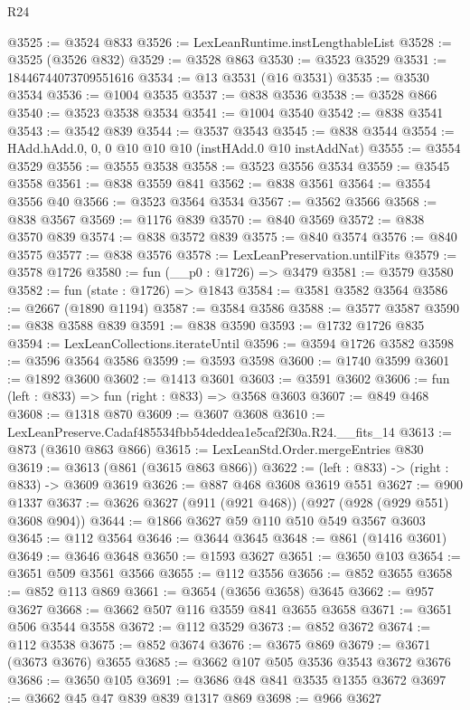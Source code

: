 \begin{lexlean}{R24}
\begin{coremodule}
@3525 := @3524 @833
@3526 := LexLeanRuntime.instLengthableList
@3528 := @3525 (@3526 @832)
@3529 := @3528 @863
@3530 := @3523 @3529
@3531 := 18446744073709551616
@3534 := @13 @3531 (@16 @3531)
@3535 := @3530 @3534
@3536 := @1004 @3535
@3537 := @838 @3536
@3538 := @3528 @866
@3540 := @3523 @3538 @3534
@3541 := @1004 @3540
@3542 := @838 @3541
@3543 := @3542 @839
@3544 := @3537 @3543
@3545 := @838 @3544
@3554 := HAdd.hAdd.{0, 0, 0} @10 @10 @10 (instHAdd.{0} @10 instAddNat)
@3555 := @3554 @3529
@3556 := @3555 @3538
@3558 := @3523 @3556 @3534
@3559 := @3545 @3558
@3561 := @838 @3559 @841
@3562 := @838 @3561
@3564 := @3554 @3556 @40
@3566 := @3523 @3564 @3534
@3567 := @3562 @3566
@3568 := @838 @3567
@3569 := @1176 @839
@3570 := @840 @3569
@3572 := @838 @3570 @839
@3574 := @838 @3572 @839
@3575 := @840 @3574
@3576 := @840 @3575
@3577 := @838 @3576
@3578 := LexLeanPreservation.untilFits
@3579 := @3578 @1726
@3580 := fun (__p0 : @1726) => @3479
@3581 := @3579 @3580
@3582 := fun (state : @1726) => @1843
@3584 := @3581 @3582 @3564
@3586 := @2667 (@1890 @1194)
@3587 := @3584 @3586
@3588 := @3577 @3587
@3590 := @838 @3588 @839
@3591 := @838 @3590
@3593 := @1732 @1726 @835
@3594 := LexLeanCollections.iterateUntil
@3596 := @3594 @1726 @3582
@3598 := @3596 @3564 @3586
@3599 := @3593 @3598
@3600 := @1740 @3599
@3601 := @1892 @3600
@3602 := @1413 @3601
@3603 := @3591 @3602
@3606 := fun (left : @833) => fun (right : @833) => @3568 @3603
@3607 := @849 @468
@3608 := @1318 @870
@3609 := @3607 @3608
@3610 := LexLeanPreserve.Cadaf485534fbb54deddea1e5caf2f30a.R24.__fits_14
@3613 := @873 (@3610 @863 @866)
@3615 := LexLeanStd.Order.mergeEntries @830
@3619 := @3613 (@861 (@3615 @863 @866))
@3622 := (left : @833) -> (right : @833) -> @3609 @3619
@3626 := @887 @468 @3608 @3619 @551
@3627 := @900 @1337
@3637 := @3626 @3627 (@911 (@921 @468)) (@927 (@928 (@929 @551) @3608 @904))
@3644 := @1866 @3627 @59 @110 @510 @549 @3567 @3603
@3645 := @112 @3564
@3646 := @3644 @3645
@3648 := @861 (@1416 @3601)
@3649 := @3646 @3648
@3650 := @1593 @3627
@3651 := @3650 @103
@3654 := @3651 @509 @3561 @3566
@3655 := @112 @3556
@3656 := @852 @3655
@3658 := @852 @113 @869
@3661 := @3654 (@3656 @3658) @3645
@3662 := @957 @3627
@3668 := @3662 @507 @116 @3559 @841 @3655 @3658
@3671 := @3651 @506 @3544 @3558
@3672 := @112 @3529
@3673 := @852 @3672
@3674 := @112 @3538
@3675 := @852 @3674
@3676 := @3675 @869
@3679 := @3671 (@3673 @3676) @3655
@3685 := @3662 @107 @505 @3536 @3543 @3672 @3676
@3686 := @3650 @105
@3691 := @3686 @48 @841 @3535 @1355 @3672
@3697 := @3662 @45 @47 @839 @839 @1317 @869
@3698 := @966 @3627

\end{coremodule}
\end{lexlean}

